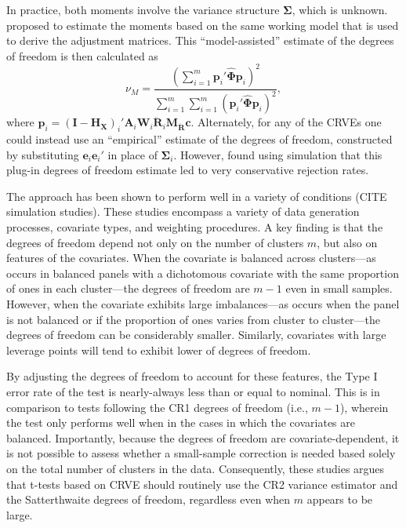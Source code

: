 \documentclass[12pt]{article}\usepackage[]{graphicx}\usepackage[]{color}
\newcommand{\bm}{\mathbf}
\newcommand{\bs}{\boldsymbol}
\begin{document}
In practice, both moments involve the variance structure $\bs\Sigma$, which is unknown. 
\citet{Bell2002bias} proposed to estimate the moments based on the same working model that is used to derive the adjustment matrices. 
This ``model-assisted'' estimate of the degrees of freedom is then calculated as 
\begin{equation}
\label{eq:nu_model}
\nu_{M} = \frac{\left(\sum_{i=1}^m \bm{p}_i' \hat{\bs\Phi} \bm{p}_i\right)^2}{\sum_{i=1}^m \sum_{i=1}^m \left(\bm{p}_i' \hat{\bs\Phi} \bm{p}_i\right)^2},
\end{equation}
where $\bm{p}_i = \left(\bm{I} - \bm{H_X}\right)_i'\bm{A}_i \bm{W}_i\bm{\ddot{R}}_i\bm{M_{\ddot{R}}} \bm{c}$.
Alternately, for any of the CRVEs one could instead use an ``empirical'' estimate of the degrees of freedom, constructed by substituting $\bm{e}_i \bm{e}_i'$ in place of $\bs\Sigma_i$. 
However, \citet{Bell2002bias} found using simulation that this plug-in degrees of freedom estimate led to very conservative rejection rates. 

The \citet{Bell2002bias} approach has been shown to perform well in a variety of conditions (CITE simulation studies). 
These studies encompass a variety of data generation processes, covariate types, and weighting procedures. 
A key finding is that the degrees of freedom depend not only on the number of clusters $m$, but also on features of the covariates. 
When the covariate is balanced across clusters---as occurs in balanced panels with a dichotomous covariate with the same proportion of ones in each cluster---the degrees of freedom are $m - 1$ even in small samples. 
However, when the covariate exhibits large imbalances---as occurs when the panel is not balanced or if the proportion of ones varies from cluster to cluster---the degrees of freedom can be considerably smaller. 
Similarly, covariates with large leverage points will tend to exhibit lower of degrees of freedom. 


By adjusting the degrees of freedom to account for these features, the Type I error rate of the test is nearly-always less than or equal to nominal. 
This is in comparison to tests following the CR1 degrees of freedom (i.e., $m - 1$), wherein the test only performs well when in the cases in which the covariates are balanced.
Importantly, because the degrees of freedom are covariate-dependent, it is not possible to assess whether a small-sample correction is needed based solely on the total number of clusters in the data. 
Consequently, these studies argues that t-tests based on CRVE should routinely use the CR2 variance estimator and the Satterthwaite degrees of freedom, regardless even when $m$ appears to be large.
\end{document}
